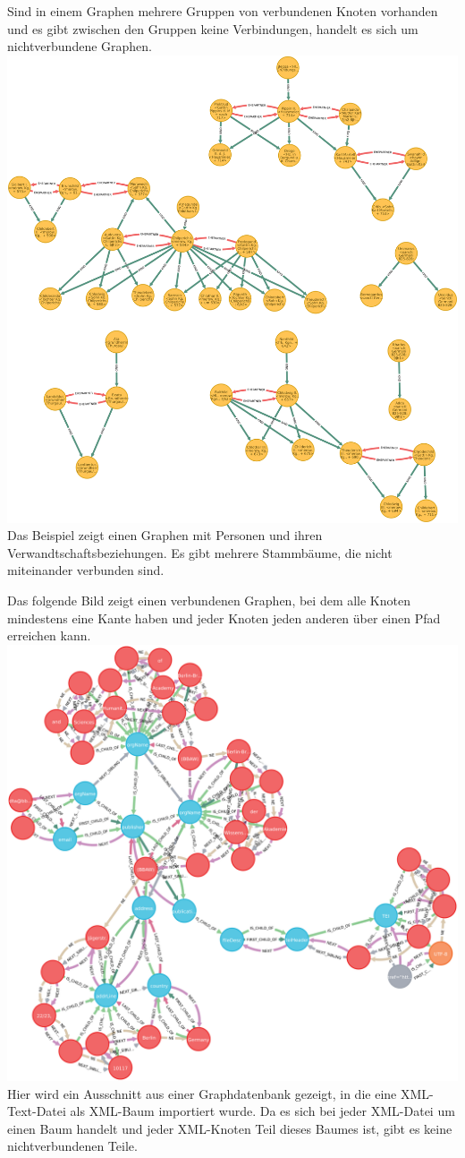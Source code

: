 \documentclass[ngerman,]{scrreprt}
\begin{document}
Sind in einem Graphen mehrere Gruppen von verbundenen Knoten vorhanden und es gibt zwischen den Gruppen keine Verbindungen, handelt es sich um nichtverbundene Graphen. \includegraphics{Bilder/disconnectedGraph.png} Das Beispiel zeigt einen Graphen mit Personen und ihren Verwandtschaftsbeziehungen. Es gibt mehrere Stammbäume, die nicht miteinander verbunden sind.

Das folgende Bild zeigt einen verbundenen Graphen, bei dem alle Knoten mindestens eine Kante haben und jeder Knoten jeden anderen über einen Pfad erreichen kann. \includegraphics{Bilder/connectedGraph.png} Hier wird ein Ausschnitt aus einer Graphdatenbank gezeigt, in die eine XML-Text-Datei als XML-Baum importiert wurde. Da es sich bei jeder XML-Datei um einen Baum handelt und jeder XML-Knoten Teil dieses Baumes ist, gibt es keine nichtverbundenen Teile.
\end{document}
